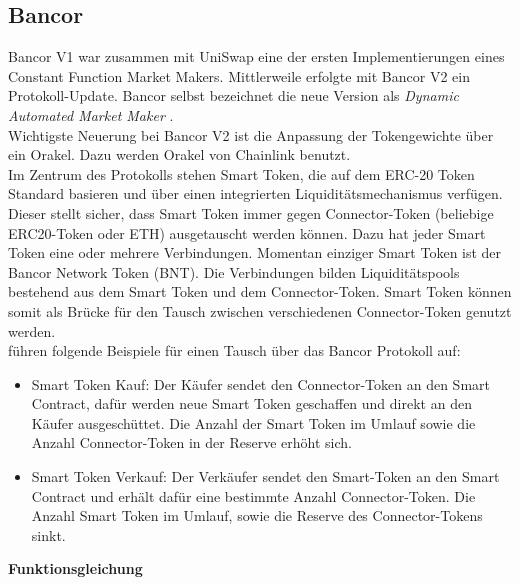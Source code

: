 \documentclass[12pt,a4paper,titlepage,oneside,english]{article}
\begin{document}
\subsection{Bancor}
Bancor V1 war zusammen mit UniSwap eine der ersten Implementierungen eines Constant Function Market Makers. Mittlerweile erfolgte mit Bancor V2 ein Protokoll-Update. Bancor selbst bezeichnet die neue Version als \textit{Dynamic Automated Market Maker} \citep{Bancor2020}.\\
Wichtigste Neuerung bei Bancor V2 ist die Anpassung der Tokengewichte über ein Orakel. Dazu werden Orakel von Chainlink benutzt. \citep[vgl.][]{Chainlink2020}\\
Im Zentrum des Protokolls stehen Smart Token, die auf dem ERC-20 Token Standard basieren und über einen integrierten Liquiditätsmechanismus verfügen. Dieser stellt sicher, dass Smart Token immer gegen Connector-Token (beliebige ERC20-Token oder ETH) ausgetauscht werden können.  Dazu hat jeder Smart Token eine oder mehrere Verbindungen. Momentan einziger Smart Token ist der Bancor Network Token (BNT). 
Die Verbindungen bilden Liquiditätspools bestehend aus dem Smart Token und dem Connector-Token.
Smart Token können somit als Brücke für den Tausch zwischen verschiedenen Connector-Token genutzt werden. \citep[vgl.][S.5]{Hertzog2018} \\
\citet[S.5f.]{Hertzog2018} führen folgende Beispiele für einen Tausch über das Bancor Protokoll auf:
\begin{itemize}
  \item{Smart Token Kauf: Der Käufer sendet den Connector-Token an den Smart Contract, dafür werden neue Smart Token geschaffen und direkt an den Käufer ausgeschüttet. Die Anzahl der Smart Token im Umlauf sowie die Anzahl Connector-Token in der Reserve erhöht sich.}
  \item{Smart Token Verkauf: Der Verkäufer sendet den Smart-Token an den Smart Contract und erhält dafür eine bestimmte Anzahl Connector-Token. Die Anzahl Smart Token im Umlauf, sowie die Reserve des Connector-Tokens sinkt. }
\end{itemize}

\textbf{Funktionsgleichung}
\end{document}
